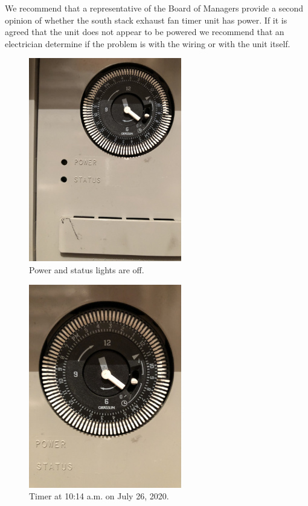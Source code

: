 \documentclass[letterpaper,12pt]{texMemo}
\begin{document}
We recommend that a representative of the Board of Managers provide a
second opinion of whether the south stack exhaust fan timer unit has
power. If it is agreed that the unit does not appear to be powered we
recommend that an electrician determine if the problem is with the wiring
or with the unit itself.

\begin{figure}
  \includegraphics[width=\linewidth,angle=-90,origin=c,height=3.5in]{images/power-status.jpg}
  \caption{Power and status lights are off.}
  \label{Figure 1}
\end{figure}

\begin{figure}
  \includegraphics[width=\linewidth,angle=-90,origin=c,height=3.5in]{images/20200726T1014.jpg}
  \caption{Timer at 10:14 a.m. on July 26, 2020.}
  \label{Figure 2}
\end{figure}
\end{document}
